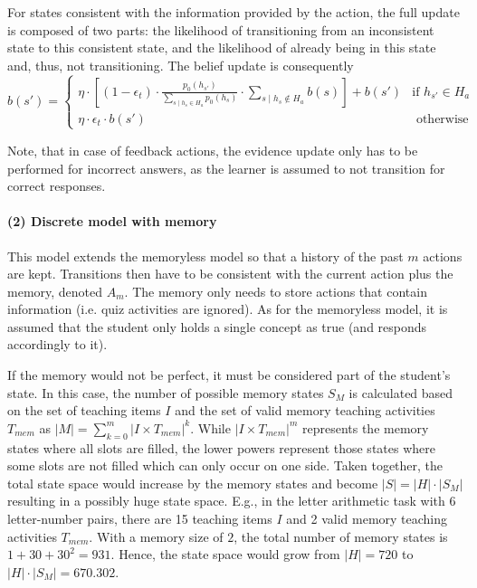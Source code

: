 For states consistent with the information provided by the action, the full update is composed of two parts: the likelihood of transitioning from an inconsistent state to this consistent state, and the likelihood of already being in this state and, thus, not transitioning.
The belief update is consequently 
\begin{equation}
    b(s')= \begin{cases}
        \eta \cdot \left[(1 - \epsilon_t) \cdot \frac{p_0(h_{s'})}{\sum_{s \mid h_s \in H_a}{p_0(h_s)}} \cdot \sum_{s \mid h_s \notin H_a}{b(s)}\right] + b(s') & \text{if } h_{s'} \in H_a \\
        \eta \cdot \epsilon_t \cdot b(s') & \text{ otherwise }
    \end{cases}
\end{equation}


Note, that in case of feedback actions, the evidence update only has to be performed for incorrect answers, as the learner is assumed to not transition for correct responses.


\paragraph{(2) Discrete model with memory}
This model extends the memoryless model so that a history of the past $m$ actions are kept.
Transitions then have to be consistent with the current action plus the memory, denoted $A_m$.
The memory only needs to store actions that contain information (i.e. quiz activities are ignored).
As for the memoryless model, it is assumed that the student only holds a single concept as true (and responds accordingly to it).


If the memory would not be perfect, it must be considered part of the student's state.
In this case, the number of possible memory states $S_M$ is calculated based on the set of teaching items $I$ and the set of valid memory teaching activities $T_{mem}$ as $|M| = \sum_{k=0}^m |I \times T_{mem}|^k$.
While $|I \times T_{mem}|^m$ represents the memory states where all slots are filled, the lower powers represent those states where some slots are not filled which can only occur on one side.
Taken together, the total state space would increase by the memory states and become $|S|=|H| \cdot |S_M|$ resulting in a possibly huge state space.
E.g., in the letter arithmetic task with 6 letter-number pairs, there are 15 teaching items $I$ and 2 valid memory teaching activities $T_{mem}$.
With a memory size of $2$, the total number of memory states is $1 + 30 + 30^2 = 931$.
Hence, the state space would grow from $|H|=720$ to $|H|\cdot|S_M|=670.302$.

